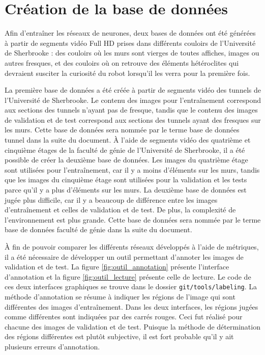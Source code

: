 \section{Création de la base de données}
    Afin d'entraîner les réseaux de neurones, deux bases de données ont été générées à partir de segments vidéo Full HD prises dans différents couloirs de l’Université de Sherbrooke : des couloirs où les murs sont vierges de toutes affiches, images ou autres fresques, et des couloirs où on retrouve des éléments hétéroclites qui devraient susciter la curiosité du robot lorsqu’il les verra pour la première fois.
    \bigskip
    
    La première base de données a été créée à partir de segments vidéo des tunnels de l'Université de Sherbrooke. Le contenu des images pour l'entraînement correspond aux sections des tunnels n'ayant pas de fresque, tandis que le contenu des images de validation et de test correspond aux sections des tunnels ayant des fresques sur les murs. Cette base de données sera nommée par le terme base de données tunnel dans la suite du document. À l'aide de segments vidéo des quatrième et cinquième étages de la faculté de génie de l'Université de Sherbrooke, il a été possible de créer la deuxième base de données. Les images du quatrième étage sont utilisées pour l'entraînement, car il y a moins d'éléments sur les murs, tandis que les images du cinquième étage sont utilisées pour la validation et les tests parce qu'il y a plus d'éléments sur les murs. La deuxième base de données est jugée plus difficile, car il y a beaucoup de différence entre les images d'entraînement et celles de validation et de test. De plus, la complexité de l'environnement est plus grande. Cette base de données sera nommée par le terme base de données faculté de génie dans la suite du document.
    \bigskip
    
    À fin de pouvoir comparer les différents réseaux développés à l'aide de métriques, il a été nécessaire de développer un outil permettant d'annoter les images de validation et de test. La figure \ref{fig:outil_annotation} présente l'interface d'annotation et la figure \ref{fig:outil_lecture} présente celle de lecture. Le code de ces deux interfaces graphiques se trouve dans le dossier \texttt{git/tools/labeling}. La méthode d'annotation se résume à indiquer les régions de l'image qui sont différentes des images d'entraînement. Dans les deux interfaces, les régions jugées comme différentes sont indiquées par des carrés rouges. Ceci fut réalisé pour chacune des images de validation et de test. Puisque la méthode de détermination des régions différentes est plutôt subjective, il est fort probable qu'il y ait plusieurs erreurs d'annotation.
    
